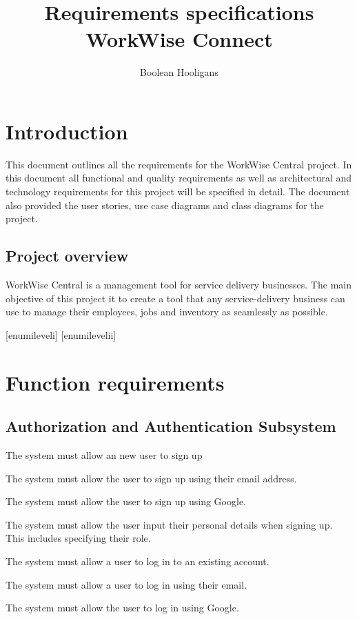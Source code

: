 \documentclass{article}
\title{%
	Requirements specifications \\
	\large WorkWise Connect}
\author{Boolean Hooligans}
\begin{document}
	
	\maketitle
	\newpage
	
	\section*{Introduction}	
	
	This document outlines all the requirements for the WorkWise Central project. In this document all functional and quality requirements as well as architectural and technology requirements for this project will be specified in detail. The document also provided the user stories, use case diagrams and class diagrams for the project. 
	
	\subsection*{Project overview}	
	WorkWise Central is a management tool for service delivery businesses. The main objective of this project it to create a tool that any service-delivery business can use to manage their employees, jobs and inventory as seamlessly as possible.  
	
	\newpage
	
	[enumileveli]
	[enumilevelii]
	
	
	\section*{Function requirements}
	\subsection*{Authorization and Authentication Subsystem}	
	\begin{list}{R.}{}
		\item The system must allow an new user to sign up
		\begin{list}{R.}{}
			\item The system must allow the user to sign up using their email address.
			\item The system must allow the user to sign up using Google.
			\item The system must allow the user input their personal details when signing up. This includes specifying their role.
		\end{list}
		\item The system must allow a user to log in to an existing account.
		\begin{list}{R.}{}
			\item The system must allow a user to log in using their email.
			\item The system must allow the user to log in using Google.
		\end{list}
	\end{list}
	
\end{document}
